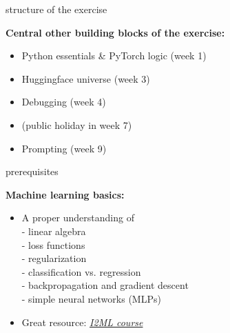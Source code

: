 \documentclass[11pt,compress,t,notes=noshow, xcolor=table]{beamer}
\begin{document}
\begin{frame}{structure of the exercise}

\vfill

\textbf{Central other building blocks of the exercise:}

	\begin{itemize}
		\item Python essentials \& PyTorch logic (week 1)
		\item Huggingface universe (week 3)
		\item Debugging (week 4)
		\item (public holiday in week 7)
		\item Prompting (week 9)
	\end{itemize}

\vfill

\end{frame}


\begin{frame}{prerequisites}
	
\vfill
	
\textbf{Machine learning basics:}

		\begin{itemize}
				\item A proper understanding of\\
				- linear algebra\\
				- loss functions\\
				- regularization\\
				- classification vs. regression\\
				- backpropagation and gradient descent\\
				- simple neural networks (MLPs)
				\item Great resource: \href{https://slds-lmu.github.io/i2ml/}{\textit{I2ML course}}
		\end{itemize}

\vfill

\end{frame}

\end{document}

